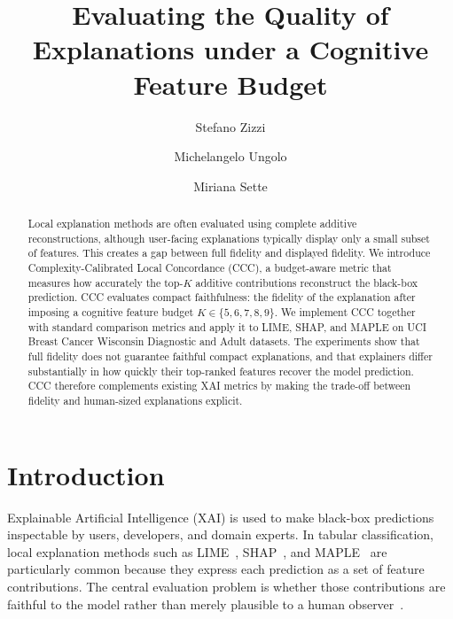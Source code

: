 \documentclass[sigconf,nonacm]{acmart}
\begin{document}
\title{Evaluating the Quality of Explanations under a Cognitive Feature Budget}

\author{Stefano Zizzi}

\author{Michelangelo Ungolo}

\author{Miriana Sette}

\begin{abstract}
Local explanation methods are often evaluated using complete additive reconstructions,
although user-facing explanations typically display only a small subset of features.
This creates a gap between full fidelity and displayed fidelity. We introduce
Complexity-Calibrated Local Concordance (CCC), a budget-aware metric that measures
how accurately the top-$K$ additive contributions reconstruct the black-box prediction.
CCC evaluates compact faithfulness: the fidelity of the explanation after imposing
a cognitive feature budget $K\in\{5,6,7,8,9\}$. We implement CCC together with standard
comparison metrics and apply it to LIME, SHAP, and MAPLE on UCI Breast Cancer Wisconsin
Diagnostic and Adult datasets. The experiments show that full fidelity does not guarantee
faithful compact explanations, and that explainers differ substantially in how quickly
their top-ranked features recover the model prediction. CCC therefore complements
existing XAI metrics by making the trade-off between fidelity and human-sized
explanations explicit.
\end{abstract}


\maketitle

\section{Introduction}
Explainable Artificial Intelligence (XAI) is used to make black-box predictions
inspectable by users, developers, and domain experts. In tabular classification,
local explanation methods such as LIME~\cite{ribeiro2016lime}, SHAP~\cite{lundberg2017shap},
and MAPLE~\cite{plumb2018maple} are particularly common because they express
each prediction as a set of feature contributions. The central evaluation
problem is whether those contributions are faithful to the model rather than
merely plausible to a human observer~\cite{doshi2017towards}.
\end{document}
